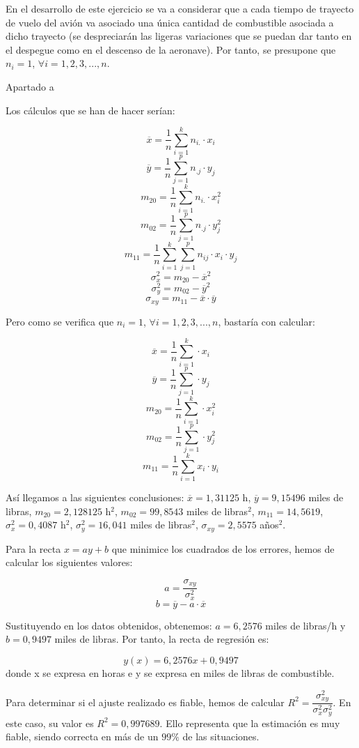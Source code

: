 \documentclass{article}
\begin{document}
En el desarrollo de este ejercicio se va a considerar que a cada tiempo de trayecto de vuelo del avión va asociado una única cantidad de combustible asociada a dicho trayecto (se despreciarán las ligeras variaciones que se puedan dar tanto en el despegue como en el descenso de la aeronave). Por tanto, se presupone que $n_i = 1$, $\forall i = 1,2,3,...,n$.

Apartado a

Los cálculos que se han de hacer serían: 

$$\overline{x} = \frac{1}{n}\sum_{i=1}^{k}n_{i.}·x_i$$
$$\overline{y} = \frac{1}{n}\sum_{j=1}^{p}n_{.j}·y_j$$
$$m_{20} = \frac{1}{n}\sum_{i=1}^{k}n_{i.}·x_i^2$$
$$m_{02} = \frac{1}{n}\sum_{j=1}^{p}n_{.j}·y_j^2$$
$$m_{11} = \frac{1}{n}\sum_{i=1}^{k}\sum_{j=1}^{p}n_{ij}·x_i·y_j$$
$$ \sigma_x^2 = m_{20} - \overline{x}^2$$
$$ \sigma_y^2 = m_{02} - \overline{y}^2$$
$$ \sigma_{xy} = m_{11} - \overline{x}·\overline{y}$$

Pero como se verifica que $n_i = 1$, $\forall i = 1,2,3,...,n$, bastaría con calcular: 

$$\overline{x} = \frac{1}{n}\sum_{i=1}^{k}·x_i$$
$$\overline{y} = \frac{1}{n}\sum_{j=1}^{p}·y_j$$
$$m_{20} = \frac{1}{n}\sum_{i=1}^{k}·x_i^2$$
$$m_{02} = \frac{1}{n}\sum_{j=1}^{p}·y_j^2$$
$$m_{11} = \frac{1}{n}\sum_{i=1}^{k}x_i·y_i$$

Así llegamos a las siguientes conclusiones: $\overline{x} = 1,31125$ h, $\overline{y} = 9,15496$ miles de libras, $m_{20} = 2,128125$ h$^2$, $m_{02} = 99,8543$ miles de libras$^2$, $m_{11} = 14,5619$, $ \sigma_x^2 = 0,4087$ h$^2$, $ \sigma_y^2 = 16,041$ miles de libras$^2$, $ \sigma_{xy} =2,5575$ años$^2$.

Para la recta $x = ay + b$ que minimice los cuadrados de los errores, hemos de calcular los siguientes valores:

$$a = \frac{\sigma_{xy}}{\sigma_x^2}$$
$$b = \overline{y} - a·\overline{x}$$

Sustituyendo en los datos obtenidos, obtenemos: $a=6,2576$ miles de libras/h y $b=0,9497$ miles de libras. Por tanto, la recta de regresión es:

$$ y(x) = 6,2576x + 0,9497 $$ donde x se expresa en horas e y se expresa en miles de libras de combustible. 

Para determinar si el ajuste realizado es fiable, hemos de calcular $R^2 = \dfrac{\sigma_{xy}^2}{\sigma_x^2\sigma_y^2}$. En este caso, su valor es $R^2 = 0,997689$. Ello representa que la estimación es muy fiable, siendo correcta en más de un $99 \%$ de las situaciones. 
\end{document}
